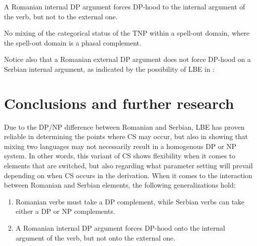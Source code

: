 \documentclass[output=paper,hidelinks,newtxmath,]{langscibook}
\begin{document}
\ea\label{15:ex31}
  A Romanian internal DP argument forces DP-hood to the internal argument of the verb, but not to the external one.
\z

\ea\label{15:ex32}
  No mixing of the categorical status of the TNP within a spell-out domain, where the spell-out domain is a phasal complement.
\z

\noindent Notice also that a Romanian external DP argument does not force DP-hood on a Serbian internal argument, as indicated by the possibility of LBE in :

\ea \label{15:ex33}
	\z
\z

\section{Conclusions and further research}\label{15:s6}

Due to the DP/NP difference between Romanian and Serbian, LBE has proven reliable in determining the points where CS may occur, but also in showing that mixing two languages may not necessarily result in a homogenous DP or NP system. In other words, this variant of CS shows flexibility when it comes to elements that are switched, but also regarding what parameter setting will prevail depending on when CS occurs in the derivation. When it comes to the interaction between Romanian and Serbian elements, the following generalizations hold:

\begin{enumerate}
    \item Romanian verbs must take a DP complement, while Serbian verbs can take either a DP or NP complements.
    \item A Romanian internal DP argument forces DP-hood onto the internal argument of the verb, but not onto the external one.
\end{enumerate}
\end{document}
